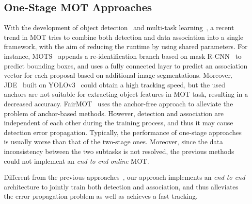 \documentclass[acmsmall]{acmart}
\begin{document}
\subsection{One-Stage MOT Approaches}
With the development of object detection~\cite{xu2021exploring} and multi-task learning~\cite{ranjan2017hyperface,kokkinos2017ubernet}, a recent trend in MOT {tries} to combine both detection and data association into a single framework, 
with the aim of reducing the runtime by using shared parameters. 
For instance, {MOTS}~\cite{voigtlaender2019mots} appends a re-identification branch based on {mask R-CNN}~\cite{he2017mask} to predict bounding boxes{, and uses a fully connected layer to predict an association vector for each proposal based on additional image segmentations}. 
Moreover, JDE~\cite{jde} built on YOLOv3~\cite{redmon2018yolov3} could obtain a high tracking speed, 
{
but the used anchors are not suitable for extracting object features in MOT task, resulting in a decreased accuracy. 
}
{FairMOT~\cite{fairmot} uses the anchor-free approach to alleviate the problem of anchor-based methods.
However, detection and association are independent of each other during the training process, 
and thus it may cause detection error propagation. 
}
Typically, the performance of one-stage approaches is usually worse than that of the two-stage ones. 
{Moreover, since the data inconsistency between the two subtasks is not resolved, 
the previous methods could not implement an \emph{end-to-end} \emph{online} MOT.}  

{
Different from the previous approaches~\cite{fairmot,jde}, 
our approach implements an \emph{end-to-end} architecture to jointly train both detection and association, 
and thus alleviates the error propagation problem as well as achieves a fast tracking. 
}
\end{document}

